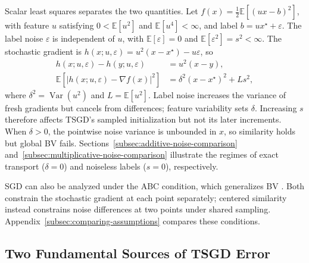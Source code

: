 Scalar least squares separates the two quantities. Let
$f(x)=\tfrac12\mathbb E[(ux-b)^2]$, with feature $u$ satisfying
$0<\mathbb E[u^2]$ and $\mathbb E[u^4]<\infty$, and label
$b=ux^\star+\varepsilon$. The label noise $\varepsilon$ is independent
of $u$, with $\mathbb E[\varepsilon]=0$ and
$\mathbb E[\varepsilon^2]=s^2<\infty$. The stochastic gradient is
$h(x;u,\varepsilon)=u^2(x-x^\star)-u\varepsilon$, so
\begin{equation}
\label{eq:least-squares-similarity}
\begin{aligned}
h(x;u,\varepsilon)-h(y;u,\varepsilon)&=u^2(x-y),\\
\mathbb E[|h(x;u,\varepsilon)-\nabla f(x)|^2]
&=\delta^2(x-x^\star)^2+Ls^2,
\end{aligned}
\end{equation}
where $\delta^2=\operatorname{Var}(u^2)$ and $L=\mathbb E[u^2]$.
Label noise increases the variance of fresh gradients but cancels from
differences; feature variability sets $\delta$. Increasing $s$ therefore
affects TSGD's sampled initialization but not its later increments.
When $\delta>0$, the pointwise noise variance is unbounded in $x$,
so similarity holds but global BV fails.
Sections~\ref{subsec:additive-noise-comparison}
and~\ref{subsec:multiplicative-noise-comparison} illustrate the regimes
of exact transport ($\delta=0$) and noiseless labels ($s=0$), respectively.

SGD can also be analyzed under the ABC condition, which generalizes BV
\citep{khaled2023better}. Both constrain the stochastic gradient at
each point separately; centered similarity instead constrains noise
differences at two points under shared sampling.
Appendix~\ref{subsec:comparing-assumptions} compares these conditions.

\subsection{Two Fundamental Sources of TSGD Error}
\label{subsec:martingale-interpretation}

